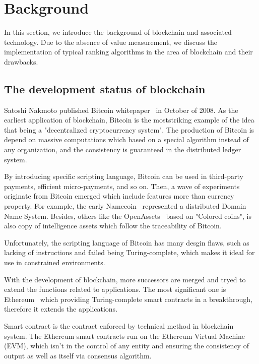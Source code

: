 
\section{Background}
In this section, we introduce the background of blockchain and associated technology. Due to the absence of value measurement, we discuss the implementation of typical ranking algorithms in the area of blockchain and their drawbacks.

\subsection{The development status of blockchain}

Satoshi Nakmoto published Bitcoin whitepaper~\cite{Nakamoto2008} in October of 2008. As the earliest application of blockchain, Bitcoin is the moststriking example of the idea that being a "decentralized cryptocurrency system". The production of Bitcoin is depend on massive computations which based on a special algorithm instead of any organization, and the consistency is guaranteed in the distributed ledger system.

By introducing specific scripting language, Bitcoin can be used in third-party payments, efficient micro-payments, and so on. Then, a wave of experiments originate from Bitcoin emerged which include features more than currency property. For example, the early Namecoin~\cite{Namecoin} represented a distributed Domain Name System. Besides, others like the OpenAssets~\cite{OpenAssets} based on "Colored coins", is  also copy of intelligence assets which follow the traceability of Bitcoin.

Unfortunately, the scripting language of Bitcoin has many desgin flaws, such as lacking of instructions and failed being Turing-complete, which makes it ideal for use in constrained environments.

With the development of blockchain, more successors are merged and tryed to extend the functions related to applications. The most significant one is Ethereum~\cite{buterin2013ethereum} which providing Turing-complete smart contracts in a breakthrough, therefore it extends the applications.

Smart contract is the contract enforced by technical method in blockchain system. The Ethereum smart contracts run on the Ethereum Virtual Machine (EVM), which isn't in the control of any entity and ensuring the consistency of output as well as itself via consensus algorithm.

